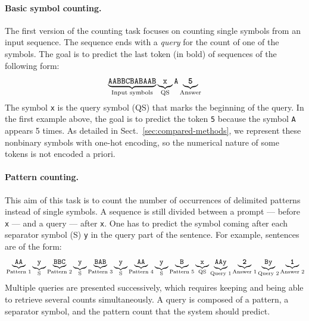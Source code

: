 {\paragraph{Basic symbol counting.}
The first version of the counting task focuses on counting single symbols from
an input sequence. The sequence ends with a \emph{query} for the count of
one of the symbols. The goal is to predict the last token (in bold) of sequences
of the following form:
{\fontsize{8}{9.6}\selectfont
  \begingroup
\addtolength{\jot}{-.5em}
\begin{align*}
  \underbrace{\texttt{\textsc{AABBCBABAAB}}}_{\text{Input symbols}}
  & \underbrace{\texttt{x}}_{\text{QS}} \texttt{A}
    \underbrace{\textbf{\texttt{5}}}_{\text{Answer}} \\
\end{align*}
\endgroup
}The symbol \texttt{x} is the query symbol (QS) that marks the beginning of the
query. In the first example above, the goal is to predict the token \texttt{5}
because the symbol \texttt{A} appears 5 times. As detailed in
Sect.~\ref{sec:compared-methods}, we represent these nonbinary symbols with
one-hot encoding, so the numerical nature of some tokens is not encoded a priori.

\paragraph{Pattern counting.}
This aim of this task is to count the number of occurrences of delimited patterns
instead of single symbols. A sequence is still divided between a prompt --- before
\texttt{x} --- and a query --- after \texttt{x}. One has to predict the symbol
coming after each separator symbol (S) \texttt{y} in the query part of the
sentence. For example, sentences are of the form: {\fontsize{8}{9.6}\selectfont
\begin{align*}
  &\underbrace{\texttt{AA}}_{\text{Pattern 1}}\underbrace{\texttt{y}}_{\text{S}}
    \underbrace{\texttt{BBC}}_{\text{Pattern 2}}\underbrace{\texttt{y}}_{\text{S}}\underbrace{\texttt{BAB}}_{\text{Pattern 3}}\underbrace{\texttt{y}}_{\text{S}}\underbrace{\texttt{AA}}_{\text{Pattern 4}}\underbrace{\texttt{y}}_{\text{S}}\underbrace{\texttt{B}}_{\text{Pattern 5}}
    \underbrace{\texttt{x}}_{\text{QS}}\underbrace{\texttt{AAy}}_{\text{Query 1}}\underbrace{\texttt{\textbf{2}}}_{\text{Answer 1}}
    \underbrace{\texttt{By}}_{\text{Query 2}}\underbrace{\texttt{\textbf{1}}}_{\text{Answer 2}} \\
\end{align*}}Multiple queries are presented successively, which requires keeping and being
able to retrieve several counts simultaneously. A query is composed of a
pattern, a separator symbol, and the pattern count that the system should
predict.

}
